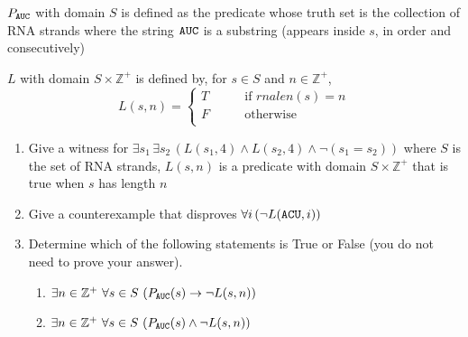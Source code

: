 \begin{description}
$P_{\texttt{A}\texttt{U}\texttt{C}}$ with domain $S$ is defined as the predicate whose truth set
is the collection of RNA strands where the string $\texttt{A}\texttt{U}\texttt{C}$
is a substring (appears inside $s$, in order and consecutively)

$L$ with domain $S \times \mathbb{Z}^+$ is defined by, for $s \in S$ and $n \in \mathbb{Z}^+$,
\[
L( s, n) = \begin{cases}
T &\qquad\text{if $rnalen(s) = n$}\\
F &\qquad\text{otherwise}\\
\end{cases}
\]
\begin{enumerate}%
\item Give a witness for $\exists s_1  \, \exists s_2 \,(L(s_1, 4) \land L(s_2,4) \land 
\neg ( s_1 = s_2) )$ where $S$ is
the set of RNA strands, $L(s, n)$ is a predicate with domain $S
\times \mathbb{Z}^+$ that is true when $s$ has length $n$

\ifsolution
{} 
\else{}
\fi

\item Give a counterexample that disproves  
$\forall i  \,(\neg L(\texttt{A}\texttt{C}\texttt{U}, i)) $ 

\ifsolution
{}
\else{}
\fi

\item Determine which of the following statements is True or False (you do not need to prove your answer).
\begin{enumerate}%
\item $\exists n \in \mathbb{Z}^+~ \forall s \in S~ ( P_{\texttt{A}\texttt{U}\texttt{C}}(s) \to \lnot L(s,n) )$

\fi

\item $\exists n \in \mathbb{Z}^+~ \forall s \in S~ ( P_{\texttt{A}\texttt{U}\texttt{C}}(s) \land \lnot L(s,n) )$


\end{enumerate}
\end{enumerate}
\end{description}
